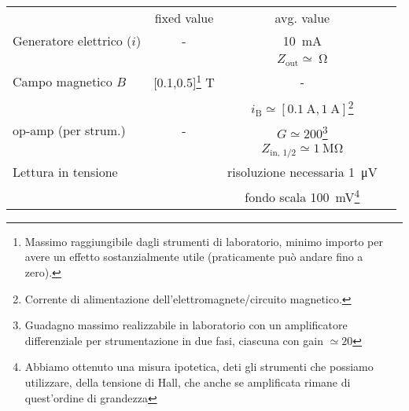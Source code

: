     \begin{tabular}{lccc}
        \toprule
        & fixed value & avg. value \\
        \colrule
        Generatore elettrico ($i$) & - & \SI{10}{\milli\ampere} \\
        & & $Z_\text{out}\simeq\SI{}{\ohm}$ \\
        Campo magnetico $B$ & [0.1,0.5]\footnote{Massimo raggiungibile dagli strumenti di laboratorio, minimo importo per avere un effetto sostanzialmente utile (praticamente può andare fino a zero).} \si{\tesla} & - \\
        && $i_\text{B}\simeq[\SI{0.1}{\ampere}, \SI{1}{\ampere}]$\footnote{Corrente di alimentazione dell'elettromagnete/circuito magnetico.} \\
        op-amp (per strum.) & - & $G\simeq 200$\footnote{Guadagno massimo realizzabile in laboratorio con un amplificatore differenziale per strumentazione in due fasi, ciascuna con gain $\simeq20$} \\
        && $Z_\text{in, 1/2}\simeq\SI{1}{\mega\ohm}$ \\
        Lettura in tensione & & risoluzione necessaria \SI{1}{\micro\volt} \\
        && fondo scala \SI{100}{\milli\volt}\footnote{Abbiamo ottenuto una misura ipotetica, deti gli strumenti che possiamo utilizzare, della tensione di Hall, che anche se amplificata rimane di quest'ordine di grandezza} \\
        \toprule
    \end{tabular}
